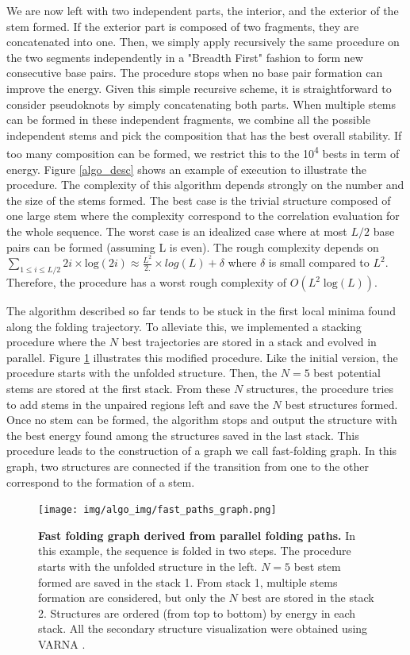 \documentclass[a4paper,12pt]{article}
\begin{document}
We are now left with two independent parts, the interior, and the exterior of
the stem formed. If the exterior part is composed of two fragments, they are
concatenated into one. Then, we simply apply recursively the same procedure on
the two segments independently in a "Breadth First" fashion to form new
consecutive base pairs. The procedure stops when no base pair formation can
improve the energy. Given this simple recursive scheme, it is straightforward to
consider pseudoknots by simply concatenating both parts. When multiple stems can
be formed in these independent fragments, we combine all the possible
independent stems and pick the composition that has the best overall stability.
If too many composition can be formed, we restrict this to the 10\textsuperscript{4} bests in
term of energy. Figure \ref{algo_desc} shows an example of execution to illustrate
the procedure. The complexity of this algorithm depends strongly on the number
and the size of the stems formed. The best case is the trivial structure
composed of one large stem where the complexity correspond to the correlation
evaluation for the whole sequence. The worst case is an idealized case where at
most \(L/2\) base pairs can be formed (assuming L is even). The rough complexity
depends on \(\sum \limits_{1\leq i \leq L/2} 2i \times \text{log}(2i) \approx
\frac{L^2}{2.} \times log(L) + \delta\) where \(\delta\) is small compared to
\(L^2\). Therefore, the procedure has a worst rough complexity of
\(O(L^2\;\text{log}(L))\).

The algorithm described so far tends to be stuck in the first local minima found
along the folding trajectory. To alleviate this, we implemented a stacking
procedure where the \(N\) best trajectories are stored in a stack and evolved in
parallel. Figure \ref{fast_path} illustrates this modified procedure. Like the
initial version, the procedure starts with the unfolded structure. Then, the
\(N=5\) best potential stems are stored at the first stack. From these \(N\)
structures, the procedure tries to add stems in the unpaired regions left and
save the \(N\) best structures formed. Once no stem can be formed, the algorithm
stops and output the structure with the best energy found among the structures
saved in the last stack. This procedure leads to the construction of a graph we
call fast-folding graph. In this graph, two structures are connected if the
transition from one to the other correspond to the formation of a stem.

\begin{figure}[htbp]
\centering
\texttt{[image: img/algo\_img/fast\_paths\_graph.png]}
\caption{\label{fast_path}\textbf{Fast folding graph derived from parallel folding paths.} In this example, the sequence is folded in two steps. The procedure starts with the unfolded structure in the left. \(N=5\) best stem formed are saved in the stack 1. From stack 1, multiple stems formation are considered, but only the \(N\) best are stored in the stack 2. Structures are ordered (from top to bottom) by energy in each stack. All the secondary structure visualization were obtained using VARNA \cite{darty09_varna}.}
\end{figure}
\end{document}
